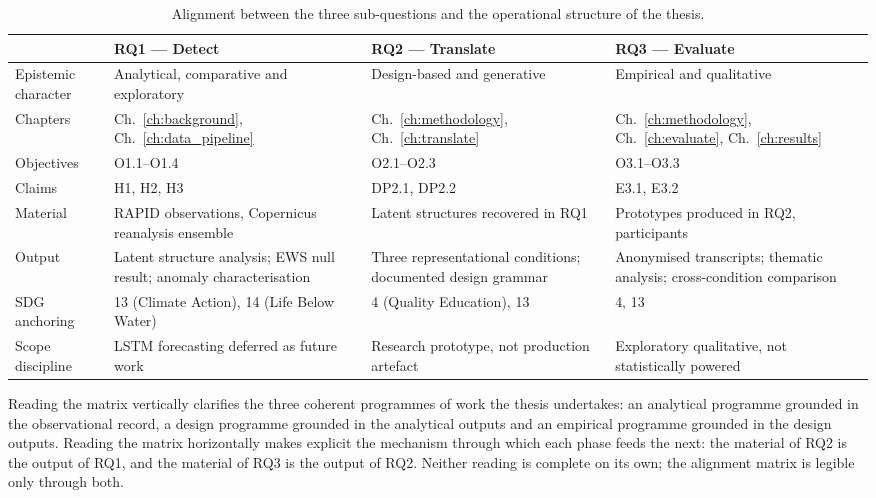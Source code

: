 \begin{table}[!ht]
    \centering
    \small
    \caption{Alignment between the three sub-questions and the operational structure of the thesis.}
    \label{tab:alignment}
    \begin{tabular}{@{}p{3.2cm}p{3.6cm}p{3.6cm}p{3.6cm}@{}}
        \toprule
        & \textbf{RQ1 --- Detect} & \textbf{RQ2 --- Translate} & \textbf{RQ3 --- Evaluate} \\
        \midrule
        Epistemic character
            & Analytical, comparative and exploratory
            & Design-based and generative
            & Empirical and qualitative \\[0.5em]
        Chapters
            & Ch.~\ref{ch:background}, Ch.~\ref{ch:data_pipeline}
            & Ch.~\ref{ch:methodology}, Ch.~\ref{ch:translate}
            & Ch.~\ref{ch:methodology}, Ch.~\ref{ch:evaluate}, Ch.~\ref{ch:results} \\[0.5em]
        Objectives
            & O1.1--O1.4
            & O2.1--O2.3
            & O3.1--O3.3 \\[0.5em]
        Claims
            & H1, H2, H3
            & DP2.1, DP2.2
            & E3.1, E3.2 \\[0.5em]
        Material
            & RAPID observations, Copernicus reanalysis ensemble
            & Latent structures recovered in RQ1
            & Prototypes produced in RQ2, participants \\[0.5em]
        Output
            & Latent structure analysis; EWS null result; anomaly characterisation
            & Three representational conditions; documented design grammar
            & Anonymised transcripts; thematic analysis; cross-condition comparison \\[0.5em]
        SDG anchoring
            & 13 (Climate Action), 14 (Life Below Water)
            & 4 (Quality Education), 13
            & 4, 13 \\[0.5em]
        Scope discipline
            & LSTM forecasting deferred as future work
            & Research prototype, not production artefact
            & Exploratory qualitative, not statistically powered \\
        \bottomrule
    \end{tabular}
\end{table}

Reading the matrix vertically clarifies the three coherent programmes of work the thesis undertakes: an analytical programme grounded in the observational record, a design programme grounded in the analytical outputs and an empirical programme grounded in the design outputs. Reading the matrix horizontally makes explicit the mechanism through which each phase feeds the next: the material of RQ2 is the output of RQ1, and the material of RQ3 is the output of RQ2. Neither reading is complete on its own; the alignment matrix is legible only through both.

